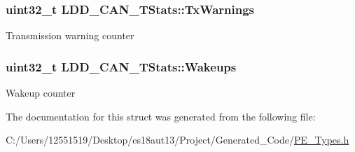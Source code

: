 \subsubsection[{Tx\+Warnings}]{\setlength{\rightskip}{0pt plus 5cm}uint32\+\_\+t L\+D\+D\+\_\+\+C\+A\+N\+\_\+\+T\+Stats\+::\+Tx\+Warnings}\label{struct_l_d_d___c_a_n___t_stats_a46ea9a5839da88b7e7b596ac34b72f90}
Transmission warning counter \hypertarget{struct_l_d_d___c_a_n___t_stats_ab59425105119b5b6496a6e0fcc8398d5}{}
\subsubsection[{Wakeups}]{\setlength{\rightskip}{0pt plus 5cm}uint32\+\_\+t L\+D\+D\+\_\+\+C\+A\+N\+\_\+\+T\+Stats\+::\+Wakeups}\label{struct_l_d_d___c_a_n___t_stats_ab59425105119b5b6496a6e0fcc8398d5}
Wakeup counter 

The documentation for this struct was generated from the following file\+:\begin{DoxyCompactItemize}
\item 
C\+:/\+Users/12551519/\+Desktop/es18aut13/\+Project/\+Generated\+\_\+\+Code/\hyperlink{_p_e___types_8h}{P\+E\+\_\+\+Types.\+h}\end{DoxyCompactItemize}

